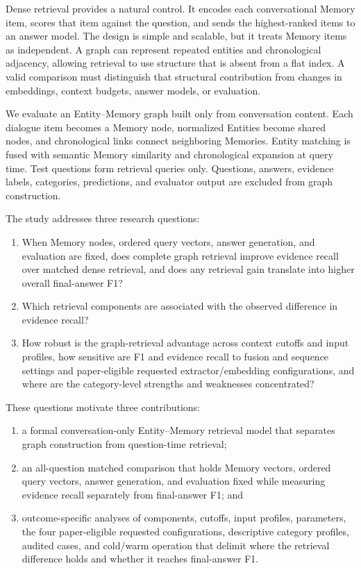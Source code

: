 \documentclass[a4paper,twoside]{article}
\begin{document}
Dense retrieval provides a natural control. It encodes each conversational
Memory item, scores that item against the question, and sends the
highest-ranked items to an answer model. The design is simple and scalable,
but it treats Memory items as independent. A graph can represent repeated
entities and chronological adjacency, allowing retrieval to use structure
that is absent from a flat index. A valid comparison must distinguish that
structural contribution from changes in embeddings, context budgets, answer
models, or evaluation.

We evaluate an Entity--Memory graph built only from conversation content.
Each dialogue item becomes a Memory node, normalized Entities become shared
nodes, and chronological links connect neighboring Memories. Entity matching
is fused with semantic Memory similarity and chronological expansion at query
time. Test questions form retrieval queries only. Questions, answers, evidence
labels, categories, predictions, and evaluator output are excluded from graph
construction.

The study addresses three research questions:

\begin{enumerate}[label=\textbf{RQ\arabic*.}]
  \item When Memory nodes, ordered query vectors, answer generation, and
  evaluation are fixed, does complete graph retrieval improve evidence recall
  over matched dense retrieval, and does any retrieval gain translate into
  higher overall final-answer F1?
  \item Which retrieval components are associated with the observed
  difference in evidence recall?
  \item How robust is the graph-retrieval advantage across context cutoffs
  and input profiles, how sensitive are F1 and evidence recall to fusion and
  sequence settings and paper-eligible requested extractor/embedding
  configurations, and where are the category-level strengths and weaknesses
  concentrated?
\end{enumerate}

These questions motivate three contributions:

\begin{enumerate}[label=(\arabic*)]
  \item a formal conversation-only Entity--Memory retrieval model that
  separates graph construction from question-time retrieval;
  \item an all-question matched comparison that holds Memory vectors, ordered
  query vectors, answer generation, and evaluation fixed while measuring
  evidence recall separately from final-answer F1; and
  \item outcome-specific analyses of components, cutoffs, input profiles,
  parameters, the four paper-eligible requested configurations, descriptive
  category profiles, audited cases, and cold/warm operation that delimit where
  the retrieval difference holds and whether it reaches final-answer F1.
\end{enumerate}
\end{document}
